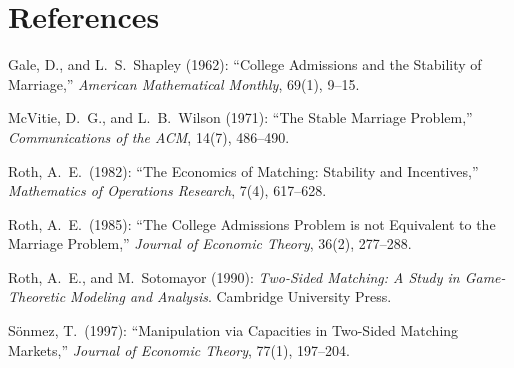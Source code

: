 \documentclass[11pt,a4paper]{article}
\begin{document}
\section*{References}

\begin{description}
\item Gale, D., and L.\ S.\ Shapley (1962): ``College Admissions and the Stability of Marriage,'' \emph{American Mathematical Monthly}, 69(1), 9--15.
\item McVitie, D.\ G., and L.\ B.\ Wilson (1971): ``The Stable Marriage Problem,'' \emph{Communications of the ACM}, 14(7), 486--490.
\item Roth, A.\ E.\ (1982): ``The Economics of Matching: Stability and Incentives,'' \emph{Mathematics of Operations Research}, 7(4), 617--628.
\item Roth, A.\ E.\ (1985): ``The College Admissions Problem is not Equivalent to the Marriage Problem,'' \emph{Journal of Economic Theory}, 36(2), 277--288.
\item Roth, A.\ E., and M.\ Sotomayor (1990): \emph{Two-Sided Matching: A Study in Game-Theoretic Modeling and Analysis}. Cambridge University Press.
\item S\"onmez, T.\ (1997): ``Manipulation via Capacities in Two-Sided Matching Markets,'' \emph{Journal of Economic Theory}, 77(1), 197--204.
\end{description}
\end{document}
